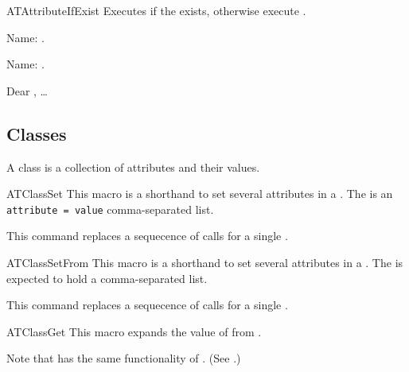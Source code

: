\documentclass[a4paper, 11pt]{article}
\begin{document}
\begin{Macrodef}{ATAttributeIfExist}{}{}
    Executes  if the  exists, otherwise execute .
\end{Macrodef}

\begin{PDExample}
    Name:  .

    Name:  .
\end{PDExample}

\begin{PDExample}
    Dear , \ldots
\end{PDExample}

\subsection{Classes}
A class is a collection of attributes and their values.

\begin{Macrodef}{ATClassSet}{}{}
    This macro is a shorthand to set several attributes in a . The  is an \mbox{\texttt{attribute~=~value}} comma-separated list.

    This command replaces a sequecence of  calls for a single .
\end{Macrodef}

\begin{Macrodef}{ATClassSetFrom}{}{}
    This macro is a shorthand to set several attributes in a . The  is expected to hold a comma-separated list.

    This command replaces a sequecence of  calls for a single .
\end{Macrodef}

\begin{Macrodef}{ATClassGet}{}{}
    This macro expands the value of  from .

    Note that  has the same functionality of . (See .)
\end{Macrodef}
\end{document}
